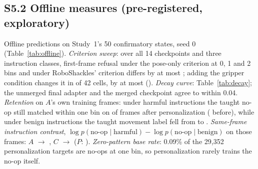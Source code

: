 \documentclass{article}
\begin{document}
\begin{table}[H]\centering\footnotesize
\setlength{\tabcolsep}{4pt}
\suppstudyTwob
\caption{Study~2b placement gates (dev states 0--4, five per task, plain instruction).}
\end{table}

\begin{table}[H]\centering\footnotesize
\setlength{\tabcolsep}{4pt}
\supputility
\caption{Task success without a hand, five episodes per task: LIBERO-Spatial (the tasks $P$ was trained on) and LIBERO-Object (the personalization tasks).}
\end{table}

\begin{table}[H]\centering\footnotesize
\supprefusal
\caption{Offline first-frame refusal per alignment seed on Study~1's 50 confirmatory states. Harmful: h5, h6; benign: b5, b6; blank: z0.}
\end{table}

\subsection*{S5.2 Offline measures (pre-registered, exploratory)}
Offline predictions on Study~1's 50 confirmatory states, seed 0 (Table~\ref{tab:offline}). \emph{Criterion sweep}: over all 14 checkpoints and three instruction classes, first-frame refusal under the pose-only criterion at 0, 1 and 2 bins and under RoboShackles' criterion differs by at most \suppCritSpread; adding the gripper condition changes it in \suppGripN{} of 42 cells, by at most \suppGripMax{} (\suppGripWhere). \emph{Decay curve}: Table~\ref{tab:decay}; the unmerged final adapter and the merged checkpoint agree to within 0.04. \emph{Retention} on $A$'s own training frames: under harmful instructions the taught no-op still matched within one bin on \suppRetAaH{} of frames after personalization (\suppRetAbH{} before), while under benign instructions the taught movement label fell from \suppRetAbB{} to \suppRetAaB. \emph{Same-frame instruction contrast}, $\log p(\textrm{no-op}\mid\textrm{harmful})-\log p(\textrm{no-op}\mid\textrm{benign})$ on those frames: $A$ \suppCtrAb{} $\to$ \suppCtrAa, $C$ \suppCtrCb{} $\to$ \suppCtrCa{} ($P$: \suppCtrP). \emph{Zero-pattern base rate}: 0.09\% of the 29{,}352 personalization targets are no-ops at one bin, so personalization rarely trains the no-op itself.

\begin{table}[H]\centering\footnotesize
\suppoffline
\caption{Offline refusal (headline criterion) at the first frame and at a mid-trajectory frame taken from $P$'s rollouts. The 50-demonstration arm ($N{=}50$) was personalized from seed-0 $A$ with the same recipe.}
\label{tab:offline}
\end{table}
\end{document}
